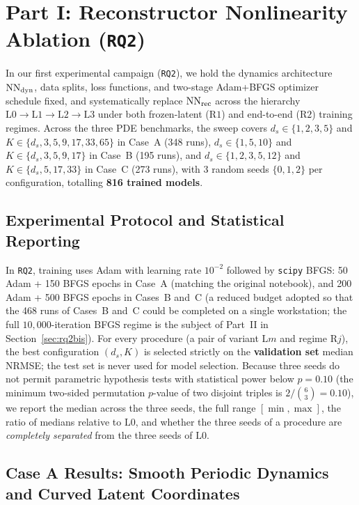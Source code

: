\section{Part I: Reconstructor Nonlinearity Ablation (\texttt{RQ2})}
\label{sec:rq2}

In our first experimental campaign (\texttt{RQ2}), we hold the dynamics architecture $\mathrm{NN}_{\mathrm{dyn}}$, data splits, loss functions, and two-stage Adam+BFGS optimizer schedule fixed, and systematically replace $\mathrm{NN}_{\mathrm{rec}}$ across the hierarchy $\mathrm{L0} \to \mathrm{L1} \to \mathrm{L2} \to \mathrm{L3}$ under both frozen-latent ($\mathrm{R1}$) and end-to-end ($\mathrm{R2}$) training regimes. Across the three PDE benchmarks, the sweep covers $d_s \in \{1,2,3,5\}$ and $K \in \{d_s, 3, 5, 9, 17, 33, 65\}$ in Case~A (348 runs), $d_s \in \{1,5,10\}$ and $K \in \{d_s, 3, 5, 9, 17\}$ in Case~B (195 runs), and $d_s \in \{1,2,3,5,12\}$ and $K \in \{d_s, 5, 17, 33\}$ in Case~C (273 runs), with 3 random seeds $\{0,1,2\}$ per configuration, totalling \textbf{816 trained models}.

\subsection{Experimental Protocol and Statistical Reporting}

In \texttt{RQ2}, training uses Adam with learning rate $10^{-2}$ followed by \texttt{scipy} BFGS: 50 Adam + 150 BFGS epochs in Case~A (matching the original notebook), and 200 Adam + 500 BFGS epochs in Cases~B and~C (a reduced budget adopted so that the 468 runs of Cases~B and~C could be completed on a single workstation; the full $10{,}000$-iteration BFGS regime is the subject of Part~II in Section~\ref{sec:rq2bis}). For every procedure (a pair of variant $\mathrm{L}m$ and regime $\mathrm{R}j$), the best configuration $(d_s, K)$ is selected strictly on the \textbf{validation set} median NRMSE; the test set is never used for model selection. Because three seeds do not permit parametric hypothesis tests with statistical power below $p = 0.10$ (the minimum two-sided permutation $p$-value of two disjoint triples is $2/\binom{6}{3} = 0.10$), we report the median across the three seeds, the full range $[\min, \max]$, the ratio of medians relative to $\mathrm{L0}$, and whether the three seeds of a procedure are \emph{completely separated} from the three seeds of $\mathrm{L0}$.

\subsection{Case A Results: Smooth Periodic Dynamics and Curved Latent Coordinates}

